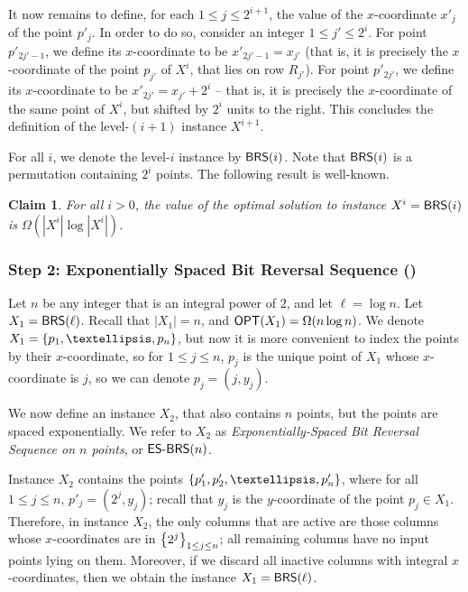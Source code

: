 \documentclass[11pt]{article}
\numberwithin{equation}{section}
\newtheorem{claim}[theorem]{Claim}
\theoremstyle{definition}
\theoremstyle{plain}
\begin{document}
It now remains to define, for each $1\leq j\leq 2^{i+1}$, the value of the $x$-coordinate $x'_j$ of the point $p'_j$. In order to do so, consider an integer $1\leq j'\leq 2^{i}$. For point $p'_{2j'-1}$, we define its $x$-coordinate to be $x'_{2j'-1}=x_{j'}$ (that is, it is precisely the $x$-coordinate of the point $p_{j'}$ of $X^i$, that lies on row $R_{j'}$). For point $p'_{2j'}$, we define its $x$-coordinate to be $x'_{2j'}=x_{j'}+2^i$ -- that is, it is precisely the $x$-coordinate of the same point of $X^i$, but shifted by $2^i$ units to the right.
This concludes the definition of the level-$(i+1)$ instance $X^{i+1}$. 

For all $i$, we denote the level-$i$ instance by $\mathsf{BRS}(i)$. Note that $\mathsf{BRS}(i)$ is a permutation containing $2^i$ points.
The following result is well-known.   
 

\begin{claim}\label{claim: large opt for BRS}
	For all $i>0$, the value of the optimal solution to instance $X^i=\mathsf{BRS}(i)$ is $\Omega(|X^i|\log |X^i|)$.
\end{claim}


%
%
%
\subsubsection{Step 2: Exponentially Spaced Bit Reversal Sequence (\ESBRS)}
%
%
%


%

Let $n$ be any integer that is an integral power of $2$, and let $\ell=\log n$. Let $X_1=\mathsf{BRS}(\ell)$. Recall that $|X_1|=n$, and  $\mbox{\sf OPT}(X_1)=\Omega(n\log n)$. We denote $X_1=\set{p_1,\ldots,p_n}$, but now it is more convenient to index the points by their $x$-coordinate, so for $1\leq j\leq n$, $p_j$ is the unique point of $X_1$ whose $x$-coordinate is $j$, so we can denote $p_j=(j,y_j)$.

We now define an instance $X_2$, that also contains $n$ points, but the points are spaced exponentially.
We refer to $X_2$ as \emph{Exponentially-Spaced Bit Reversal Sequence on $n$ points}, or $\mbox{\sf{ES-BRS}}(n)$.

Instance $X_2$ contains the points $\set{p'_1,p'_2,\ldots,p'_n}$, where  for all $1\leq j\leq n$, $p'_j=(2^j,y_j)$; recall that $y_j$ is the $y$-coordinate of the point $p_j\in X_1$. Therefore, in instance $X_2$, the only columns that are active are those columns whose $x$-coordinates are in $\left\{ 2^j \right\}_{1\leq j\leq n}$; all remaining columns have no input points lying on them. Moreover, if we discard all inactive columns with integral $x$-coordinates, then we obtain the instance $X_1=\mathsf{BRS}(\ell)$.
\end{document}
